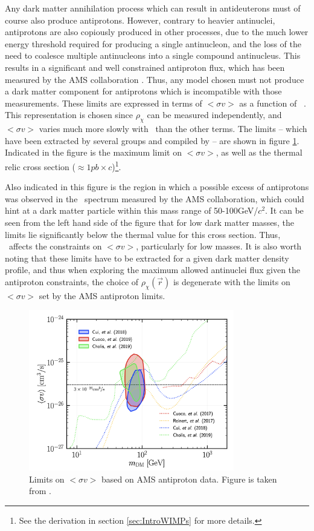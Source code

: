 Any dark matter annihilation process which can result in antideuterons must of course also produce antiprotons. However, contrary to heavier antinuclei, antiprotons are also copiously produced in other processes, due to the much lower energy threshold required for producing a single antinucleon, and the loss of the need to coalesce multiple antinucleons into a single compound antinucleus. This results in a significant and well constrained antiproton flux, which has been measured by the AMS collaboration \cite{}. Thus, any model chosen must not produce a dark matter component for antiprotons which is incompatible with those measurements. These limits are expressed in terms of $<\sigma v>$ as a function of \dmm\ . This representation is chosen since $\rho_\chi$ can be measured independently, and $<\sigma v>$ varies much more slowly with \dmm\ than the other terms. The limits -- which have been extracted by several groups \cite{} and compiled by \cite{}-- are shown in figure \ref{fig:DMSigmaVLimits}. Indicated in the figure is the maximum limit on $<\sigma v>$, as well as the thermal relic cross section ($\approx 1pb \times c$)\footnote{See the derivation in section \ref{sec:IntroWIMPs} for more details.}. 

Also indicated in this figure is the region in which a possible excess of antiprotons was observed in the \pbar\ spectrum measured by the AMS collaboration, which could hint at a dark matter particle within this mass range of 50-100GeV/$c^2$. It can be seen from the left hand side of the figure that for low dark matter masses, the limits lie significantly below the thermal value for this cross section. Thus, \dmm\ affects the constraints on  $<\sigma v>$, particularly for low masses. It is also worth noting that these limits have to be extracted for a given dark matter density profile, and thus when exploring the maximum allowed antinuclei flux given the antiproton constraints, the choice of $\rho_\chi(\vec{r})$ is degenerate with the limits on $<\sigma v>$ set by the AMS antiproton limits.\\

\begin{figure}[hbtp]
    \centering
    \includegraphics[width=0.8\textwidth]{figures/PbarLimitsAMS.png}
    \caption{Limits on  $<\sigma v>$ based on AMS antiproton data. Figure is taken from \cite{}.}
    \label{fig:DMSigmaVLimits}
\end{figure}

